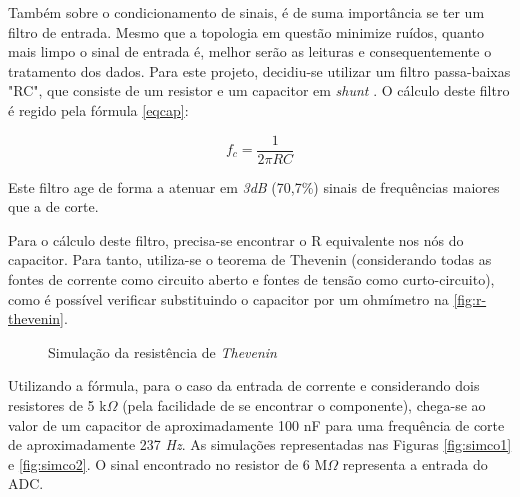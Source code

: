 Também sobre o condicionamento de sinais, é de suma importância se ter um filtro de entrada. Mesmo que a topologia em questão minimize ruídos, quanto mais limpo o sinal de entrada é, melhor serão as leituras e consequentemente o tratamento dos dados. Para este projeto, decidiu-se utilizar um filtro passa-baixas "RC", que consiste de um resistor e um capacitor em \textit{shunt} \cite{filtros}. O cálculo deste filtro é regido pela fórmula \autoref{eqcap}:

\begin{equation}
    \label{eqcap}
    f_{c} = \frac{1}{2\pi RC}
\end{equation}

Este filtro age de forma a atenuar em \textit{3dB} (70,7\%) sinais de frequências maiores que a de corte.

Para o cálculo deste filtro, precisa-se encontrar o R equivalente nos nós do capacitor. Para tanto, utiliza-se o teorema de Thevenin (considerando todas as fontes de corrente como circuito aberto e fontes de tensão como curto-circuito), como é possível verificar substituindo o capacitor por um ohmímetro na \autoref{fig:r-thevenin}.

\begin{figure}[htb!]
    \caption{Simulação da resistência de \textit{Thevenin}}
    \vspace*{5mm}
    \label{fig:r-thevenin}
    \fonte{}
\end{figure}

Utilizando a fórmula, para o caso da entrada de corrente e considerando dois resistores de 5 k$\Omega$ (pela facilidade de se encontrar o componente), chega-se ao valor de um capacitor de aproximadamente 100 nF para uma frequência de corte de aproximadamente 237 \textit{Hz}. As simulações representadas nas Figuras \ref{fig:simco1} e \ref{fig:simco2}. O sinal encontrado no resistor de 6 M$\Omega$ representa a entrada do \gls{ADC}.

